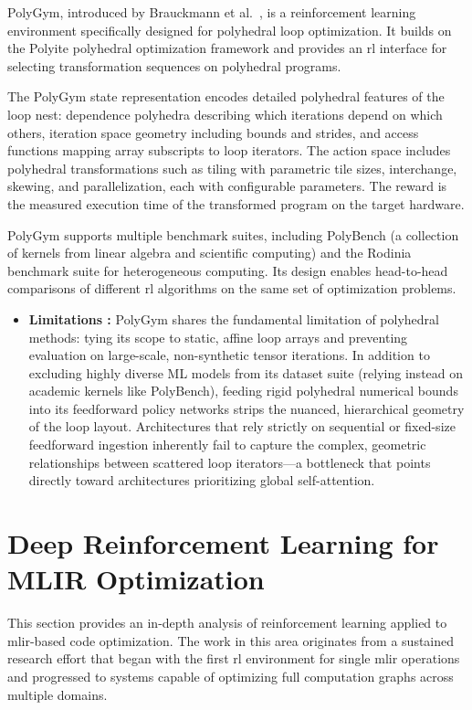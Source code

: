 PolyGym, introduced by Brauckmann et al.~\cite{brauckmann2021polygym}, is a reinforcement learning environment specifically designed for polyhedral loop optimization. It builds on the Polyite polyhedral optimization framework and provides an \gls{rl} interface for selecting transformation sequences on polyhedral programs.

The PolyGym state representation encodes detailed polyhedral features of the loop nest: dependence polyhedra describing which iterations depend on which others, iteration space geometry including bounds and strides, and access functions mapping array subscripts to loop iterators. The action space includes polyhedral transformations such as tiling with parametric tile sizes, interchange, skewing, and parallelization, each with configurable parameters. The reward is the measured execution time of the transformed program on the target hardware.

PolyGym supports multiple benchmark suites, including PolyBench (a collection of kernels from linear algebra and scientific computing) and the Rodinia benchmark suite for heterogeneous computing. Its design enables head-to-head comparisons of different \gls{rl} algorithms on the same set of optimization problems.

\begin{itemize}
\item \textbf{Limitations :} PolyGym shares the fundamental limitation of polyhedral methods: tying its scope to static, affine loop arrays and preventing evaluation on large-scale, non-synthetic tensor iterations. In addition to excluding highly diverse ML models from its dataset suite (relying instead on academic kernels like PolyBench), feeding rigid polyhedral numerical bounds into its feedforward policy networks strips the nuanced, hierarchical geometry of the loop layout. Architectures that rely strictly on sequential or fixed-size feedforward ingestion inherently fail to capture the complex, geometric relationships between scattered loop iterators—a bottleneck that points directly toward architectures prioritizing global self-attention.
\end{itemize}

\section{Deep Reinforcement Learning for MLIR Optimization}

This section provides an in-depth analysis of reinforcement learning applied to \gls{mlir}-based code optimization. The work in this area originates from a sustained research effort that began with the first \gls{rl} environment for single \gls{mlir} operations and progressed to systems capable of optimizing full computation graphs across multiple domains.

